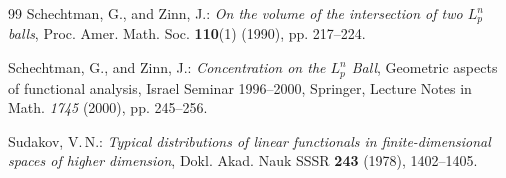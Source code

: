 \documentclass[a4paper,12pt]{amsart}
\numberwithin{equation}{section}
\theoremstyle{remark}
\begin{document}
\begin{thebibliography}{99}
 Schechtman, G., and Zinn, J.: \emph{On the volume of the intersection of two $L_p^n$ balls}, Proc. Amer. Math. Soc. \textbf{110}(1) (1990), pp. 217--224.

 Schechtman, G., and Zinn, J.: \emph{Concentration on the $L_p^n$ Ball}, Geometric aspects of functional analysis, Israel Seminar 1996--2000, Springer, Lecture Notes in Math. \emph{1745} (2000), pp. 245--256.

 Sudakov, V.\,N.: \emph{Typical distributions of linear functionals in finite-dimensional spaces of higher dimension},  Dokl. Akad. Nauk SSSR \textbf{243} (1978), 1402--1405.

\end{thebibliography}
\end{document}
